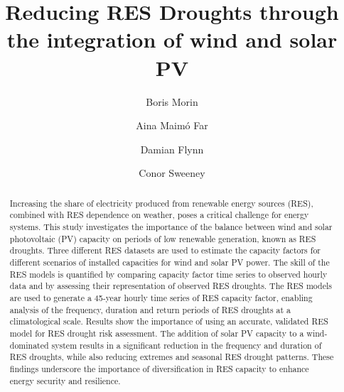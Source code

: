 \documentclass[preprint, 12pt]{elsarticle}
\begin{document}
\begin{frontmatter}


\title{Reducing RES Droughts through the integration of wind and solar PV}

\author[Math]{Boris Morin }

\author[Math]{Aina Maimó Far}

\author[Eng]{Damian Flynn}

\author[Math]{Conor Sweeney}




\begin{abstract}
Increasing the share of electricity produced from renewable energy sources (RES), combined with RES dependence on weather, poses a critical challenge for energy systems. This study investigates the importance of the balance between wind and solar photovoltaic (PV) capacity on periods of low renewable generation, known as RES droughts. Three different RES datasets are used to estimate the capacity factors for different scenarios of installed capacities for wind and solar PV power. The skill of the RES models is quantified by comparing capacity factor time series to observed hourly data and by assessing their representation of observed RES droughts. The RES models are used to generate a 45-year hourly time series of RES capacity factor, enabling analysis of the frequency, duration and return periods of RES droughts at a climatological scale. Results show the importance of using an accurate, validated RES model for RES drought risk assessment. The addition of solar PV capacity to a wind-dominated system results in a significant reduction in the frequency and duration of RES droughts, while also reducing extremes and seasonal RES drought patterns. These findings underscore the importance of diversification in RES capacity to enhance energy security and resilience.
\end{abstract}


\end{frontmatter}
\end{document}

